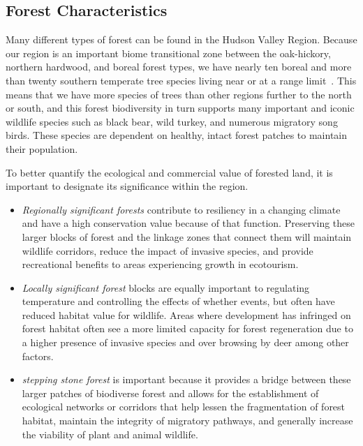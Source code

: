\subsection*{Forest Characteristics}\label{subsec:forestcharacteristics}
Many different types of forest can be found in the Hudson Valley Region.
Because our region is an important biome transitional zone between the
oak-hickory, northern hardwood, and boreal forest types, we have nearly ten
boreal and more than twenty southern temperate tree species living near or at a
range limit~\citep{ldeo}. This means that we have more species of trees than other regions
further to the north or south, and this forest biodiversity in turn supports
many important and iconic wildlife species such as black bear, wild turkey, and
numerous migratory song birds. These species are dependent on healthy, intact
forest patches to maintain their population.

To better quantify the ecological and commercial value of forested land, it is
important to designate its significance within the region.
\begin{itemize}
    \item \textit{Regionally significant forests} contribute to resiliency in a
        changing climate and have a high conservation value because of that
        function. Preserving these larger blocks of forest and the linkage zones that
        connect them will maintain wildlife corridors, reduce the impact of invasive
        species, and provide recreational benefits to areas experiencing growth in
        eco\-tourism. 
    \item \textit{Locally significant forest} blocks are equally important to 
        regulating temperature and controlling the effects of whether
        events, but often have reduced habitat value for wildlife. Areas where
        development has infringed on forest habitat often see a more limited
        capacity for forest regeneration due to a higher presence of invasive
        species and over browsing by deer among other factors. 
    \item \textit{stepping stone forest} is important because it provides a
        bridge between these larger patches of biodiverse forest and allows
        for the establishment of ecological networks or corridors that help
        lessen the fragmentation of forest habitat, maintain the integrity
        of migratory pathways, and generally increase the viability of
        plant and animal wildlife.
\end{itemize}

